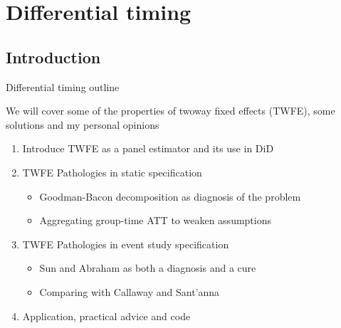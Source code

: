 \documentclass{beamer}
\begin{document}



\section{Differential timing}

\subsection{Introduction}

\begin{frame}{Differential timing outline}

We will cover some of the properties of twoway fixed effects (TWFE), some solutions and my personal opinions

\bigskip

\begin{enumerate}
	\item Introduce TWFE as a panel estimator and its use in DiD
	\item TWFE Pathologies in static specification
		\begin{itemize}
		\item Goodman-Bacon decomposition as diagnosis of the problem
		\item Aggregating group-time ATT to weaken assumptions
		\end{itemize}
	\item TWFE Pathologies in event study specification
		\begin{itemize}
		\item Sun and Abraham as both a diagnosis and a cure 
		\item Comparing with Callaway and Sant'anna
		\end{itemize}
	\item Application, practical advice and code
\end{enumerate}

\end{frame}	
\end{document}
